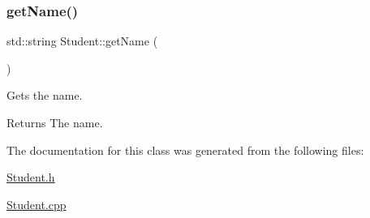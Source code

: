 \subsubsection{\texorpdfstring{get\+Name()}{getName()}}
{\footnotesize\ttfamily std\+::string Student\+::get\+Name (\begin{DoxyParamCaption}{ }\end{DoxyParamCaption})}



Gets the name. 

\begin{DoxyReturn}{Returns}
The name. 
\end{DoxyReturn}


The documentation for this class was generated from the following files\+:\begin{DoxyCompactItemize}
\item 
\hyperlink{_student_8h}{Student.\+h}\item 
\hyperlink{_student_8cpp}{Student.\+cpp}\end{DoxyCompactItemize}
